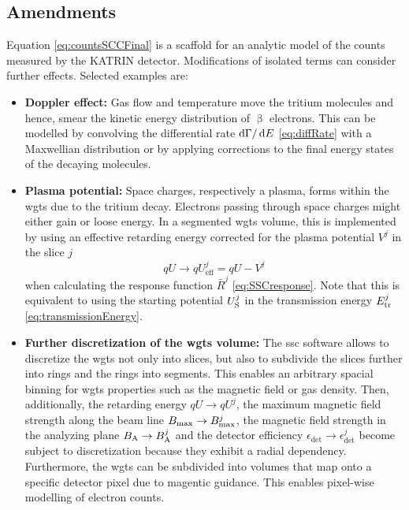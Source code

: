 \subsection{Amendments}
Equation \eqref{eq:countsSCCFinal} is a scaffold for an analytic model of the counts measured by the KATRIN detector. Modifications of isolated terms can consider further effects. Selected examples are:
\begin{itemize}
    \item \textbf{Doppler effect:} Gas flow and temperature move the tritium molecules and hence, smear the kinetic energy distribution of $\upbeta$ electrons. This can be modelled by convolving the differential rate $\mathop{}\!\mathrm{d} \Gamma / \mathop{}\!\mathrm{d} E$ \eqref{eq:diffRate} with a Maxwellian distribution or by applying corrections to the final energy states of the decaying molecules.
    \item \textbf{Plasma potential:} Space charges, respectively a plasma, forms within the \gls{wgts} due to the tritium decay. Electrons passing through space charges might either gain or loose energy. In a segmented \gls{wgts} volume, this is implemented by using an effective retarding energy corrected for the plasma potential $V^j$ in the slice $j$
    \begin{equation}
        qU \rightarrow qU^j_\mathrm{eff} = qU - V^j
    \end{equation} 
    when calculating the response function $\bar{R}^j$ \eqref{eq:SSCresponse}. Note that this is equivalent to using the starting potential $U^j_\mathrm{S}$ in the transmission energy $E^j_\mathrm{tr}$ \eqref{eq:transmissionEnergy}.
    \item \textbf{Further discretization of the \gls{wgts} volume:} The \gls{ssc} software allows to discretize the \gls{wgts} not only into slices, but also to subdivide the slices further into rings and the rings into segments. This enables an arbitrary spacial binning for \gls{wgts} properties such as the magnetic field or gas density. Then, additionally, the retarding energy $qU \rightarrow qU^j$, the maximum magnetic field strength  along the beam line $B_\mathrm{max} \rightarrow B_\mathrm{max}^j$, the magnetic field strength in the analyzing plane $B_\mathrm{A} \rightarrow B_\mathrm{A}^j$ and the detector efficiency $\epsilon_\mathrm{det} \rightarrow \epsilon_\mathrm{det}^j$ become subject to discretization because they exhibit a radial dependency. Furthermore, the \gls{wgts} can be subdivided into volumes that map onto a specific detector pixel due to magentic guidance. This enables pixel-wise modelling of electron counts.
\end{itemize}